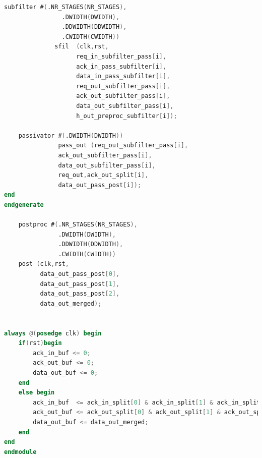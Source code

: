 \documentclass[a4paper,twoside,11pt, fleqn]{article}
\begin{document}
\begin{lstlisting}[language=Verilog]
    subfilter #(.NR_STAGES(NR_STAGES),
    			.DWIDTH(DWIDTH),
    			.DDWIDTH(DDWIDTH),
    			.CWIDTH(CWIDTH))
              sfil	(clk,rst,
                    req_in_subfilter_pass[i],
                    ack_in_pass_subfilter[i],
                    data_in_pass_subfilter[i],
                    req_out_subfilter_pass[i],
                    ack_out_subfilter_pass[i],
                    data_out_subfilter_pass[i],
                    h_out_preproc_subfilter[i]);

    passivator #(.DWIDTH(DWIDTH))
               pass_out (req_out_subfilter_pass[i],
               ack_out_subfilter_pass[i],
               data_out_subfilter_pass[i],
               req_out,ack_out_split[i],
               data_out_pass_post[i]);
end
endgenerate

    postproc #(.NR_STAGES(NR_STAGES), 
    		   .DWIDTH(DWIDTH),
    		   .DDWIDTH(DDWIDTH),
    		   .CWIDTH(CWIDTH))
    post (clk,rst,
          data_out_pass_post[0], 
          data_out_pass_post[1], 
          data_out_pass_post[2],
          data_out_merged);


always @(posedge clk) begin
    if(rst)begin
        ack_in_buf <= 0;
        ack_out_buf <= 0;
        data_out_buf <= 0;
    end
    else begin
        ack_in_buf  <= ack_in_split[0] & ack_in_split[1] & ack_in_split[2];
        ack_out_buf <= ack_out_split[0] & ack_out_split[1] & ack_out_split[2];
        data_out_buf <= data_out_merged;
    end
end
endmodule
\end{lstlisting}
\end{document}
